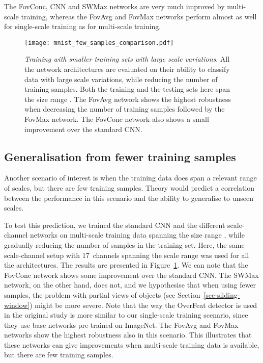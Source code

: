 \documentclass[twocolumn,runningheads]{svjour3}
\begin{document}
  The FovConc, CNN and SWMax networks are very much improved by
  multi-scale training, whereas the FovAvg and FovMax networks perform
  almost as well for single-scale training as for
  multi-scale training.

\begin{figure}[hbpt]
	\begin{center}
		\texttt{[image: mnist\_few\_samples\_comparison.pdf]}		
	\end{center}
	\caption{{\em Training  with smaller training sets with large
            scale variations\/}. All the network architectures are evaluated
          on their ability to classify data with large scale
          variations, while reducing the number of training
          samples. Both the training and the testing sets here span the size
          range . The Fov\-Avg network shows the highest
          robustness when decreasing the number of training samples
          followed by the FovMax network. 
         The FovConc network also shows a small improvement over the
         standard CNN.}
	\label{fig-mnist_few_samples}
\end{figure}

\subsection{Generalisation from fewer training samples}

Another scenario of interest is when the training data does span a
relevant range of scales, but there are few training samples. Theory
would predict a correlation between the performance in this scenario
and the ability to generalise to unseen scales. 

To test this prediction, we trained the standard CNN and the different
scale-channel networks on multi-scale training data spanning the size
range , while gradually reducing the number of samples in the
training set. Here, the same scale-channel setup with 17~channels
spanning the scale range  was used for all the
architectures. The results are presented in
Figure~\ref{fig-mnist_few_samples}.
We can note that the FovConc network
shows some improvement over the standard CNN. The SWMax network, on
the other hand, does not, and we hypothesise that when using fewer
samples, the problem with partial views of objects (see
Section~\ref{sec-sliding-window}) might be more severe.
Note that the way the OverFeat detector is used in the original study
\cite{SerEigZhaMatFerLeC13-arXiv} is more similar to our single-scale
training scenario, since they use base networks pre-trained on
ImageNet.  The FovAvg and FovMax networks show the highest robustness
also in this scenario. This illustrates that these networks can give
improvements when multi-scale training data is available, but there are
few training samples. 
\end{document}
